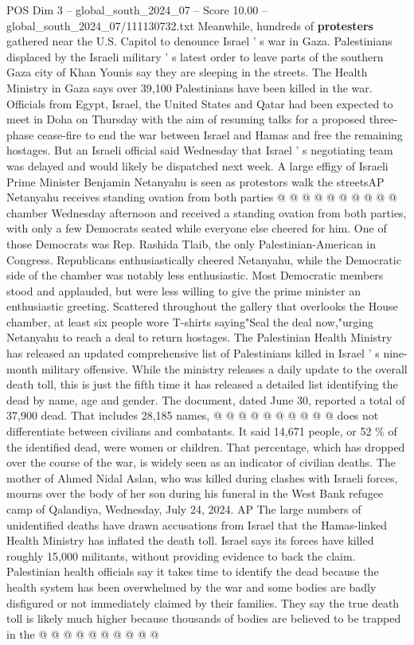 \begin{textsample}{POS Dim 3 – global\_south\_2024\_07 – Score 10.00 – global\_south\_2024\_07/111130732.txt}
Meanwhile, hundreds of \textbf{protesters} gathered near the U.S.
Capitol to denounce Israel ' s war in Gaza.
Palestinians displaced by the Israeli military ' s latest order to leave parts of the southern Gaza city of Khan Younis say they are sleeping in the streets.
The Health Ministry in Gaza says over 39,100 Palestinians have been killed in the war.
Officials from Egypt, Israel, the United States and Qatar had been expected to meet in Doha on Thursday with the aim of resuming talks for a proposed three-phase cease-fire to end the war between Israel and Hamas and free the remaining hostages.
But an Israeli official said Wednesday that Israel ' s negotiating team was delayed and would likely be dispatched next week.
A large effigy of Israeli Prime Minister Benjamin Netanyahu is seen as protestors walk the streetsAP Netanyahu receives standing ovation from both parties @ @ @ @ @ @ @ @ @ @ chamber Wednesday afternoon and received a standing ovation from both parties, with only a few Democrats seated while everyone else cheered for him.
One of those Democrats was Rep.
Rashida Tlaib, the only Palestinian-American in Congress.
Republicans enthusiastically cheered Netanyahu, while the Democratic side of the chamber was notably less enthusiastic.
Most Democratic members stood and applauded, but were less willing to give the prime minister an enthusiastic greeting.
Scattered throughout the gallery that overlooks the House chamber, at least six people wore T-shirts saying"Seal the deal now,"urging Netanyahu to reach a deal to return hostages.
The Palestinian Health Ministry has released an updated comprehensive list of Palestinians killed in Israel ' s nine-month military offensive.
While the ministry releases a daily update to the overall death toll, this is just the fifth time it has released a detailed list identifying the dead by name, age and gender.
The document, dated June 30, reported a total of 37,900 dead.
That includes 28,185 names, @ @ @ @ @ @ @ @ @ @ does not differentiate between civilians and combatants.
It said 14,671 people, or 52 \% of the identified dead, were women or children.
That percentage, which has dropped over the course of the war, is widely seen as an indicator of civilian deaths.
The mother of Ahmed Nidal Aslan, who was killed during clashes with Israeli forces, mourns over the body of her son during his funeral in the West Bank refugee camp of Qalandiya, Wednesday, July 24, 2024.
AP The large numbers of unidentified deaths have drawn accusations from Israel that the Hamas-linked Health Ministry has inflated the death toll.
Israel says its forces have killed roughly 15,000 militants, without providing evidence to back the claim.
Palestinian health officials say it takes time to identify the dead because the health system has been overwhelmed by the war and some bodies are badly disfigured or not immediately claimed by their families.
They say the true death toll is likely much higher because thousands of bodies are believed to be trapped in the @ @ @ @ @ @ @ @ @ @

\end{textsample}
